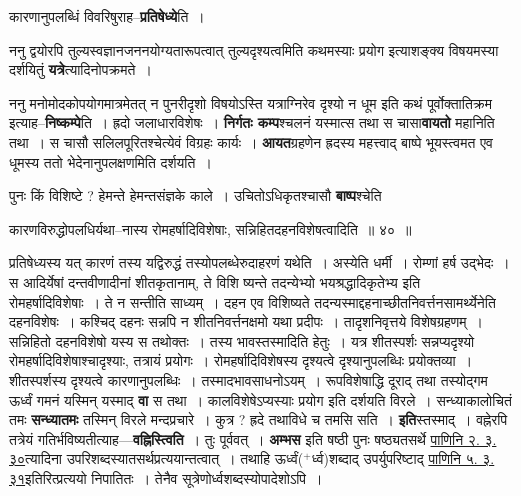 \documentclass[article,12pt,a4paper]{memoir}
\newcommand{\add}[1]{($^{+}$#1)}
\begin{document}
	  \pstart कारणानुपलब्धिं विवरिषुराह--\textbf{प्रतिषेध्ये}ति ।
	\pend
      

	  \pstart ननु द्वयोरपि तुल्यस्वज्ञानजननयोग्यतारूपत्वात् तुल्यदृश्यत्वमिति कथमस्याः प्रयोग इत्याशङ्क्य विषयमस्या दर्शयितुं \textbf{यत्रे}त्यादिनोपक्रमते ।
	\pend
      

	  \pstart ननु मनोमोदकोपयोगमात्रमेतत् न पुनरीदृशो विषयोऽस्ति यत्राग्निरेव दृश्यो न धूम इति कथं पूर्वोक्तातिक्रम इत्याह--\textbf{निष्कम्पे}ति । ह्रदो जलाधारविशेषः । \textbf{निर्गतः कम्प}श्चलनं यस्मात्स तथा स चासा\textbf{वायतो} महानिति तथा । स चासौ सलिलपूरितश्चेत्येवं विग्रहः कार्यः । \textbf{आयत}ग्रहणेन ह्रदस्य महत्त्वाद् बाष्पे भूयस्त्वमत एव धूमस्य ततो भेदेनानुपलक्षणमिति दर्शयति ।
	\pend
      

	  \pstart पुनः किं विशिष्टे ? हेमन्ते हेमन्तसंज्ञके काले । उचितोऽधिकृतश्चासौ \textbf{बाष्प}श्चेति  \leavevmode{} 
	  
	कारणविरुद्धोपलधिर्यथा--नास्य रोमहर्षादिविशेषाः, सन्निहितदहनविशेषत्वादिति ॥ ४० ॥ 
	  
	प्रतिषेध्यस्य यत् कारणं तस्य यद्विरुद्धं तस्योपलब्धेरुदाहरणं यथेति । अस्येति धर्मी । रोम्णां हर्ष उद्भेदः । स आदिर्येषां दन्तवीणादीनां शीतकृतानाम्, ते विशि ष्यन्ते तदन्येभ्यो भयश्रद्धादिकृतेभ्य इति रोमहर्षादिविशेषाः । ते न सन्तीति साध्यम् । दहन एव विशिष्यते तदन्यस्माद्दहनाच्छीतनिवर्त्तनसामर्थ्येनेति दहनविशेषः । कश्चिद् दहनः सन्नपि न शीतनिवर्त्तनक्षमो यथा प्रदीपः । तादृशनिवृत्तये विशेषग्रहणम् । सन्निहितो दहनविशेषो यस्य स तथोक्तः । तस्य भावस्तस्मादिति हेतुः । यत्र शीतस्पर्शः सन्नप्यदृश्यो रोमहर्षादिविशेषाश्चादृश्याः, तत्रायं प्रयोगः । रोमहर्षादिविशेषस्य दृश्यत्वे दृश्यानुपलब्धिः प्रयोक्तव्या । शीतस्पर्शस्य दृश्यत्वे कारणानुपलब्धिः । तस्मादभावसाधनोऽयम् । रूपविशेषाद्धि दूराद् तथा तस्योद्गम ऊर्ध्वं गमनं यस्मिन् यस्माद् \textbf{वा} स तथा । कालविशेषेऽप्यस्याः प्रयोग इति दर्शयति विरले । सन्ध्याकालोचितं तमः \textbf{सन्ध्यातमः} तस्मिन् विरले मन्दप्रचारे । कुत्र ? ह्रदे तथाविधे च तमसि सति । \textbf{इति}स्तस्माद् । वह्नेरपि तत्रेयं गतिर्भविष्यतीत्याह—\textbf{वह्निस्त्विति} । तुः पूर्ववत् । \textbf{अम्भस} इति षष्ठी पुनः षष्ठ्यतसर्थे \href{http://sarit.indology.info/?cref=Pā.2.3.30}{पाणिनि २. ३. ३०}त्यादिना उपरिशब्दस्यातसर्थप्रत्ययान्तत्वात् । तथाहि ऊर्ध्वं\add{र्ध्व}शब्दाद् उपर्युपरिष्टाद्  \href{http://sarit.indology.info/?cref=Pā.5.3.31}{पाणिनि ५. ३. ३१}इतिरित्प्रत्ययो निपातितः । तेनैव सूत्रेणोर्ध्वशब्दस्योपादेशोऽपि ।
	\pend
      
\end{document}
